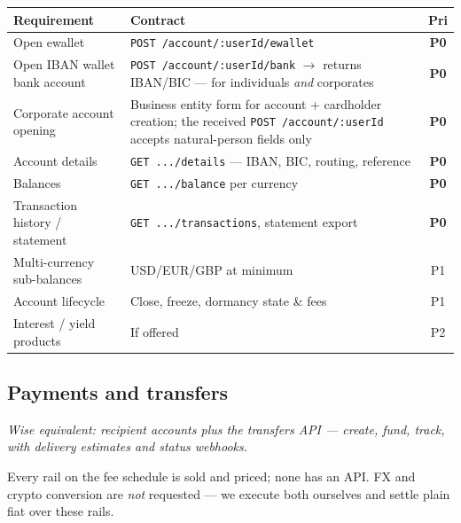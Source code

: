 \documentclass[11pt]{article}
\newcommand{\ep}[1]{\texttt{\small #1}}
\newcommand{\pri}[1]{\textbf{#1}}
\begin{document}
\begin{table}[H]
\centering
\small
\begin{tabular}{@{}p{5.4cm}p{7.2cm}c@{}}
\toprule
\textbf{Requirement} & \textbf{Contract} & \textbf{Pri} \\
\midrule
Open ewallet & \ep{POST /account/:userId/ewallet} & \pri{P0} \\
Open IBAN wallet bank account & \ep{POST /account/:userId/bank} $\rightarrow$ returns IBAN/BIC --- for individuals \emph{and} corporates & \pri{P0} \\
Corporate account opening & Business entity form for account + cardholder creation; the received \ep{POST /account/:userId} accepts natural-person fields only & \pri{P0} \\
Account details & \ep{GET .../details} --- IBAN, BIC, routing, reference & \pri{P0} \\
Balances & \ep{GET .../balance} per currency & \pri{P0} \\
Transaction history / statement & \ep{GET .../transactions}, statement export & \pri{P0} \\
Multi-currency sub-balances & USD/EUR/GBP at minimum & P1 \\
Account lifecycle & Close, freeze, dormancy state \& fees & P1 \\
Interest / yield products & If offered & P2 \\
\bottomrule
\end{tabular}
\end{table}

\subsection{Payments and transfers}\label{sec:pay}

\emph{Wise equivalent: recipient accounts plus the transfers API --- create, fund, track, with delivery estimates and status webhooks.}

Every rail on the fee schedule is sold and priced; none has an API. FX and crypto conversion are \emph{not} requested --- we execute both ourselves and settle plain fiat over these rails.
\end{document}
